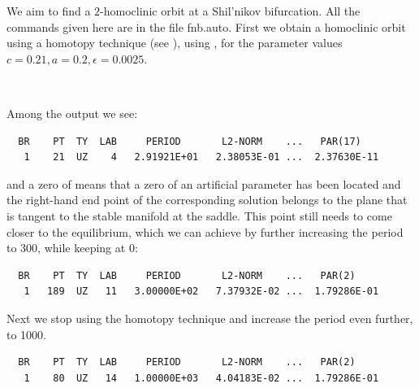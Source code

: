 \documentclass[12pt]{report}
\begin{document}
We aim to find a $2$-homoclinic orbit at a Shil'nikov bifurcation.
All the commands given here are in the file fnb.auto.
First we obtain a homoclinic orbit using a homotopy technique (see
), using , for the parameter 
values $c=0.21, a=0.2, \epsilon=0.0025$.

\begin{center}
\\
\end{center}

Among the output we see:
\begin{verbatim}
  BR    PT  TY  LAB     PERIOD       L2-NORM    ...   PAR(17)
   1    21  UZ    4   2.91921E+01   2.38053E-01 ...  2.37630E-11
\end{verbatim}
and a zero of  means that a zero of an artificial parameter has
been located and the right-hand end point of the corresponding
solution belongs to the plane that is tangent to the stable manifold
at the saddle. This point still needs to come closer to the
equilibrium, which we can achieve by further increasing the period to
300, while keeping  at 0:
\begin{center}
\end{center}
\begin{verbatim}
  BR    PT  TY  LAB     PERIOD       L2-NORM    ...   PAR(2)
   1   189  UZ   11   3.00000E+02   7.37932E-02 ...  1.79286E-01
\end{verbatim}

Next we stop using the homotopy technique and increase the period even
further, to 1000.
\begin{center}
\end{center}
\begin{verbatim}
  BR    PT  TY  LAB     PERIOD       L2-NORM    ...   PAR(2)
   1    80  UZ   14   1.00000E+03   4.04183E-02 ...  1.79286E-01
\end{verbatim}
\end{document}
